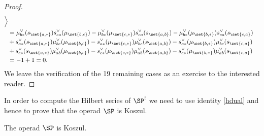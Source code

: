 \begin{proof}
\begin{align}
        \Big\rangle  \\ \nonumber
        &= \mu_{b\ast}^{\vee}(s_{\set{a,\ast}})s_{ca}^{\vee}(\mu_{\set{b,c}}) 
        -\mu_{b\ast}^{\vee}(\mu_{\set{c,\ast}})s_{ca}^{\vee}(s_{\set{a,b}}) 
        -\mu_{b\ast}^{\vee}(\mu_{\set{b,\ast}})s_{ca}^{\vee}(s_{\set{c,a}}) \\ \nonumber
        &+ s_{a\ast}^{\vee}(s_{\set{a,\ast}})\mu_{bc}^{\vee}(\mu_{\set{b,c}}) 
        - s_{a\ast}^{\vee}(\mu_{\set{c,\ast}})\mu_{bc}^{\vee}(s_{\set{a,b}}) 
        - s_{a\ast}^{\vee}(\mu_{\set{b,\ast}})\mu_{bc}^{\vee}(s_{\set{c,a}}) \\ \nonumber
        &+ s_{c\ast}^{\vee}(s_{\set{a,\ast}})\mu_{ab}^{\vee}(\mu_{\set{b,c}}) 
        - s_{c\ast}^{\vee}(\mu_{\set{c,\ast}})\mu_{ab}^{\vee}(s_{\set{a,b}}) 
        - s_{c\ast}^{\vee}(\mu_{\set{b,\ast}})\mu_{ab}^{\vee}(s_{\set{c,a}}) \\ \nonumber
        &= -1 +1 = 0.
    \end{align}
    We leave the verification of the 19 remaining cases as an exercise to the interested reader.
\end{proof}

In order to compute the Hilbert series of $\SP^!$ we need to use identity \eqref{hdual} and hence to prove 
that the operad $\SP$ is Koszul.

\begin{prop}\label{sp_koszul}
    The operad $\SP$ is Koszul.
\end{prop}

